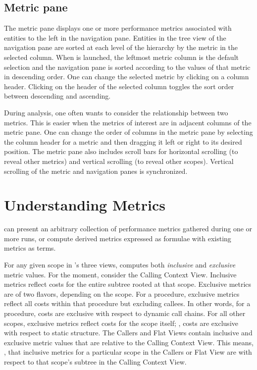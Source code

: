 
\subsection{Metric pane}
\label{sec:pane-metric}

The metric pane displays one or more performance metrics associated with entities to the left in the navigation pane.
Entities in the tree view of the navigation pane are sorted at each level of the hierarchy by the metric in the selected column.
When \hpcviewer{} is launched, the leftmost metric column is the default selection and the navigation pane is sorted according to the values of that metric in descending order.
One can change the selected metric by clicking on a column header.
Clicking on the header of the selected column toggles the sort order between descending and ascending.

During analysis, one often wants to consider the relationship between two metrics.
This is easier when the metrics of interest are in adjacent columns of the metric pane.
One can change the order of columns in the metric pane by selecting the column header for a metric and then dragging it left or right to its desired position.
The metric pane also includes scroll bars for horizontal scrolling (to reveal other metrics) and vertical scrolling (to reveal other scopes).
Vertical scrolling of the metric and navigation panes is synchronized.



\section{Understanding Metrics}

\hpcviewer{} can present an arbitrary collection of performance metrics gathered during one or more runs, or compute derived metrics expressed as formulae with existing metrics as terms.

For any given scope in \hpcviewer{}'s three views, \hpcviewer{} computes both \emph{inclusive} and \emph{exclusive} metric values.
For the moment, consider the Calling Context View.
Inclusive metrics reflect costs for the entire subtree rooted at that scope.
Exclusive metrics are of two flavors, depending on the scope.
For a procedure, exclusive metrics reflect all costs within that procedure but excluding callees.
In other words, for a procedure, costs are exclusive with respect to dynamic call chains.
For all other scopes, exclusive metrics reflect costs for the scope itself; \ie{}, costs are exclusive with respect to static structure.
The Callers and Flat Views contain inclusive and exclusive metric values that are relative to the Calling Context View.
This means, \eg{}, that inclusive metrics for a particular scope in the Callers or Flat View are with respect to that scope's subtree in the Calling Context View.


